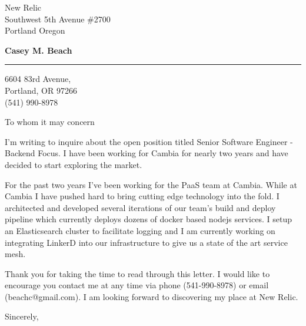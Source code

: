 \documentclass{letter} %
\begin{document}
\signature{Casey M. Beach}           %
\longindentation=0pt                       %
\let\raggedleft\raggedright                %
 
 
\begin{letter}{
New Relic \\
Southwest 5th Avenue \#2700 \\
Portland Oregon \\
}

\begin{center}
{\large\bf Casey M. Beach}
\end{center}
\medskip\hrule height 1pt
\begin{center}
6604 83rd Avenue,\\
Portland, OR 97266 \\
(541) 990-8978 
\end{center} 
\vspace{1in}

 
\opening{To whom it may concern} 
\begin{flushleft} 

\noindent I'm writing to inquire about the open position titled Senior Software Engineer - Backend Focus. I have 
been working for Cambia for nearly two years and have decided to start exploring the market.

\noindent For the past two years I've been working for the PaaS team at Cambia. While at Cambia I have pushed hard
to bring cutting edge technology into the fold. I architected and developed several iterations of our team's build and 
deploy pipeline which currently deploys dozens of docker based nodejs services. I setup an Elasticsearch cluster
to facilitate logging and I am currently working on integrating LinkerD into our infrastructure to give us a state 
of the art service mesh.

\noindent Thank you for taking the time to read through this letter. I would like to encourage you
contact me at any time via phone (541-990-8978) or email (beachc@gmail.com). I am looking forward to 
discovering my place at New Relic.

\end{flushleft}
\closing{Sincerely,} 
\vfill %
\end{letter}
\end{document}
